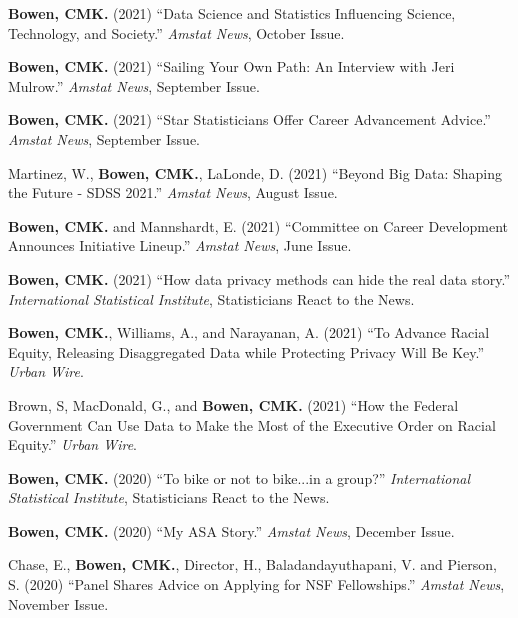 \documentclass[11pt, letterpaper, roman]{moderncv} %
\begin{document}
\begin{etaremune}[topsep=0pt, itemsep=4pt, partopsep=0pt, parsep=0pt]
    \item \textbf{Bowen, CMK.} (2021) ``Data Science and Statistics Influencing Science, Technology, and Society.'' \textit{Amstat News}, October Issue.
    
    \item \textbf{Bowen, CMK.} (2021) ``Sailing Your Own Path: An Interview with Jeri Mulrow.'' \textit{Amstat News}, September Issue.

    \item \textbf{Bowen, CMK.} (2021) ``Star Statisticians Offer Career Advancement Advice.'' \textit{Amstat News}, September Issue.    
    
    \item Martinez, W., \textbf{Bowen, CMK.}, LaLonde, D. (2021) ``Beyond Big Data: Shaping the Future - SDSS 2021.'' \textit{Amstat News}, August Issue.   
    
    \item \textbf{Bowen, CMK.} and Mannshardt, E. (2021) ``Committee on Career Development Announces Initiative Lineup.'' \textit{Amstat News}, June Issue.

    \item \textbf{Bowen, CMK.} (2021) ``How data privacy methods can hide the real data story.'' \textit{International Statistical Institute}, Statisticians React to the News.
    
    \item \textbf{Bowen, CMK.}, Williams, A., and Narayanan, A. (2021) ``To Advance Racial Equity, Releasing Disaggregated Data while Protecting Privacy Will Be Key.'' \textit{Urban Wire}. 
    
    \item Brown, S, MacDonald, G., and \textbf{Bowen, CMK.} (2021) ``How the Federal Government Can Use Data to Make the Most of the Executive Order on Racial Equity.'' \textit{Urban Wire}. 

    \item \textbf{Bowen, CMK.} (2020) ``To bike or not to bike...in a group?'' \textit{International Statistical Institute}, Statisticians React to the News.

    \item \textbf{Bowen, CMK.} (2020) ``My ASA Story.'' \textit{Amstat News}, December Issue.

    \item Chase, E., \textbf{Bowen, CMK.}, Director, H., Baladandayuthapani, V. and Pierson, S. (2020) ``Panel Shares Advice on Applying for NSF Fellowships.'' \textit{Amstat News}, November Issue.


\end{etaremune}
\end{document}
